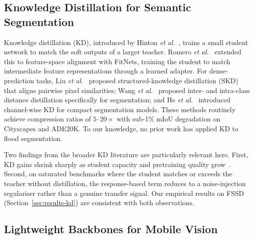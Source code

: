 \subsection{Knowledge Distillation for Semantic Segmentation}
\label{sec:rw-kd}

Knowledge distillation (KD), introduced by Hinton \emph{et al.}~\cite{hinton2015distilling}, trains a small student network to match the soft outputs of a larger teacher. Romero \emph{et al.}~\cite{romero2015fitnets} extended this to feature-space alignment with FitNets, training the student to match intermediate feature representations through a learned adapter. For dense-prediction tasks, Liu \emph{et al.}~\cite{liu2019structured} proposed structured-knowledge distillation (SKD) that aligns pairwise pixel similarities; Wang \emph{et al.}~\cite{wang2020intra} proposed inter- and intra-class distance distillation specifically for segmentation; and He \emph{et al.}~\cite{he2021channel} introduced channel-wise KD for compact segmentation models. These methods routinely achieve compression ratios of $5$--$20\times$ with sub-1\% mIoU degradation on Cityscapes and ADE20K. To our knowledge, no prior work has applied KD to flood segmentation.

Two findings from the broader KD literature are particularly relevant here. First, KD gains shrink sharply as student capacity and pretraining quality grow~\cite{romero2015fitnets,beyer2022patient}. Second, on saturated benchmarks where the student matches or exceeds the teacher without distillation, the response-based term reduces to a noise-injection regulariser rather than a genuine transfer signal. Our empirical results on FSSD (Section~\ref{sec:results-kd}) are consistent with both observations.

\subsection{Lightweight Backbones for Mobile Vision}
\label{sec:rw-backbones}

